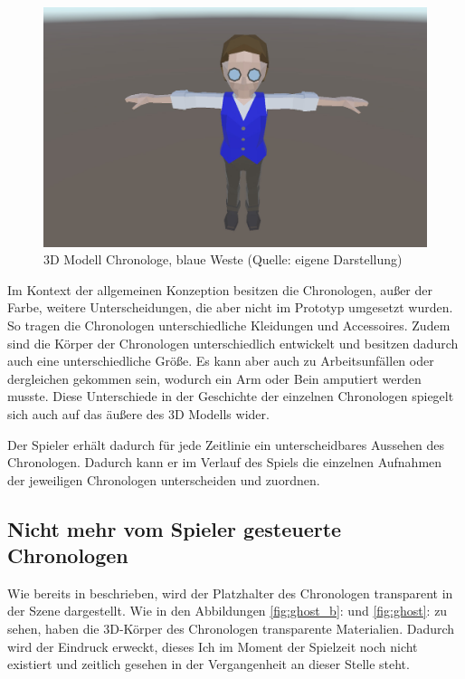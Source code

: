 \begin{figure}[ht]
\centering
\includegraphics[width=0.8\linewidth]{content/pictures/Chronologe_b.jpg}
\caption{3D Modell Chronologe, blaue Weste (Quelle: eigene Darstellung)}
\label{fig:chronologe_b}
\end{figure}

Im Kontext der allgemeinen Konzeption besitzen die Chronologen, außer der Farbe, weitere Unterscheidungen, die aber nicht im Prototyp umgesetzt wurden. So tragen die Chronologen unterschiedliche Kleidungen und Accessoires. Zudem sind die Körper der Chronologen unterschiedlich entwickelt und besitzen dadurch auch eine unterschiedliche Größe. Es kann aber auch zu Arbeitsunfällen oder dergleichen gekommen sein, wodurch ein Arm oder Bein amputiert werden musste. Diese Unterschiede in der Geschichte der einzelnen Chronologen spiegelt sich auch auf das äußere des \ac{3D} Modells wider. 

Der Spieler erhält dadurch für jede Zeitlinie ein unterscheidbares Aussehen des Chronologen. Dadurch kann er im Verlauf des Spiels die einzelnen Aufnahmen der jeweiligen Chronologen unterscheiden und zuordnen.

\subsection{Nicht mehr vom Spieler gesteuerte Chronologen}
Wie bereits in  beschrieben, wird der Platzhalter des Chronologen transparent in der Szene dargestellt. Wie in den Abbildungen \ref{fig:ghost_b}:  und \ref{fig:ghost}:  zu sehen, haben die \ac{3D}-Körper des Chronologen transparente Materialien. Dadurch wird der Eindruck erweckt, dieses Ich im Moment der Spielzeit noch nicht existiert und zeitlich gesehen in der Vergangenheit an dieser Stelle steht.

